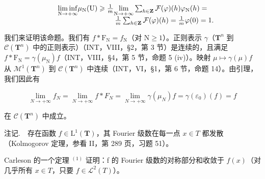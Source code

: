 \[
\begin{array}{r l} & {\underset {\mathrm{N} \to + \infty} {\liminf} \mu_ {\mathrm{N}} (\mathrm{U}) \geqslant \frac {1}{m} \underset {\mathrm{N} \to + \infty} {\lim} \sum_ {h \in \mathbf {Z}} \mathcal {F} (\varphi) (h) \varphi_ {\mathrm{N}} (h) =} \\ & {\qquad \qquad \qquad \qquad \frac {1}{m} \sum_ {h \in \mathbf {Z}} \mathcal {F} (\varphi) (h) = \frac {1}{m} \varphi (0) = 1.} \end{array}
\]

我们来证明该命题。我们有 \(f * \mathrm{F}_{\mathrm{N}} = f_{\mathrm{N}}\)（对 \(\mathrm{N} \geqslant 1\)）。正则表示 \(\gamma\)（\(\mathbf{T}^n\) 到 \(\mathcal{C}(\mathbf{T}^n)\) 中的正则表示）（INT，VIII，§2，第 3 节）是连续的，且满足 \(f * \mathrm{F}_{\mathrm{N}} = \gamma(\mu_{\mathrm{N}})f\)（INT，VIII，§4，第 5 节，命题 5 (iv)）。映射 \(\mu \mapsto \gamma(\mu)f\) 从 \(\mathcal{M}^1(\mathbf{T}^n)\) 到 \(\mathcal{C}(\mathbf{T}^n)\) 中连续（INT，VI，§1，第 6 节，命题 14）。由引理，我们因此有

\[
\lim _ {N \to + \infty} f _ {N} = \lim _ {N \to + \infty} f * F _ {N} = \lim _ {N \to + \infty} \gamma (\mu_ {N}) f = \gamma (\varepsilon_ {0}) (f) = f
\]

在 \(\mathcal{C}(\mathbf{T}^n)\) 中成立。

注记.　存在函数 \(f \in \mathrm{L}^{1}(\mathbf{T})\)，其 Fourier 级数在每一点 \(x \in T\) 都发散（Kolmogorov 定理，参看 II，第 289 页，习题 51）。

Carleson 的一个定理 \(^{(1)}\) 证明：f 的 Fourier 级数的对称部分和收敛于 \(f(x)\)（对几乎所有 \(x \in T\)，只要 \(f \in \mathcal{L}^{2}(T)\)）。

